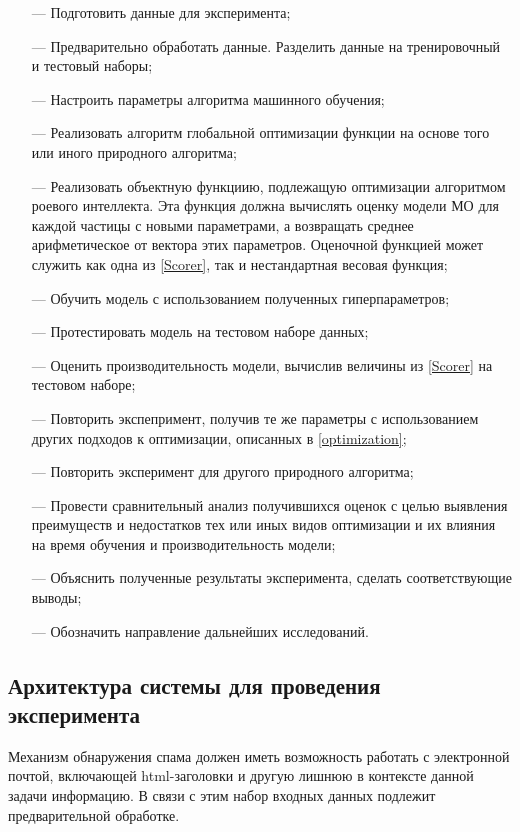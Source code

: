 \begin{itemize}
      \item[—] Подготовить данные для эксперимента;
      \item[—] Предварительно обработать данные. Разделить данные на тренировочный
            и тестовый наборы;
      \item[—] Настроить параметры алгоритма машинного обучения;
      \item[—] Реализовать алгоритм глобальной оптимизации функции на основе того или иного природного алгоритма;
      \item[—] Реализовать объектную функциию, подлежащую оптимизации алгоритмом роевого интеллекта.
            Эта функция должна вычислять оценку модели МО для каждой частицы с новыми параметрами, а
            возвращать среднее арифметическое от вектора этих параметров.
            Оценочной функцией может служить как одна из \ref{Scorer}, так и
            нестандартная весовая функция;
      \item[—] Обучить модель с использованием полученных гиперпараметров;
      \item[—] Протестировать модель на тестовом наборе данных;
      \item[—] Оценить производительность модели, вычислив величины из \ref{Scorer} на
            тестовом наборе;
      \item[—] Повторить экспепримент, получив те же параметры с использованием
            других подходов к оптимизации, описанных в \ref{optimization};
      \item[—] Повторить эксперимент для другого природного алгоритма;
      \item[—] Провести сравнительный анализ получившихся оценок с целью выявления
            преимуществ и недостатков тех или иных видов оптимизации и их влияния на
            время обучения и производительность модели;
      \item[—] Объяснить полученные результаты эксперимента, сделать соответствующие выводы;
      \item[—] Обозначить направление дальнейших исследований.
\end{itemize}

\subsection{Архитектура системы для проведения эксперимента}

Механизм обнаружения спама должен иметь возможность работать с электронной почтой,
включающей html-заголовки и другую лишнюю в контексте данной задачи информацию.
В связи с этим набор входных данных подлежит предварительной обработке.

